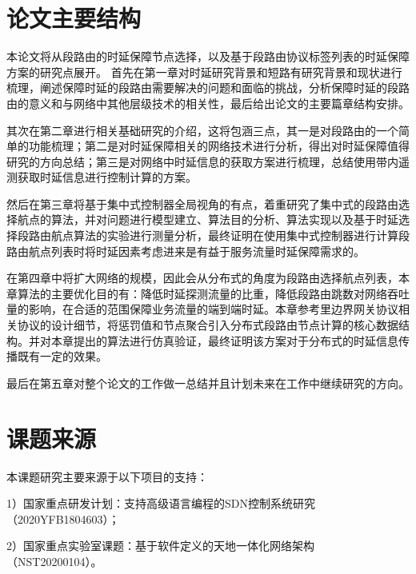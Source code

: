 \section{论文主要结构}

本论文将从段路由的时延保障节点选择，以及基于段路由协议标签列表的时延保障方案的研究点展开。
首先在第一章对时延研究背景和短路有研究背景和现状进行梳理，阐述保障时延的段路由需要解决的问题和面临的挑战，分析保障时延的段路由的意义和与网络中其他层级技术的相关性，最后给出论文的主要篇章结构安排。

其次在第二章进行相关基础研究的介绍，这将包涵三点，其一是对段路由的一个简单的功能梳理；第二是对时延保障相关的网络技术进行分析，得出对时延保障值得研究的方向总结；第三是对网络中时延信息的获取方案进行梳理，总结使用带内遥测获取时延信息进行控制计算的方案。

然后在第三章将基于集中式控制器全局视角的有点，着重研究了集中式的段路由选择航点的算法，并对问题进行模型建立、算法目的分析、算法实现以及基于时延选择段路由航点算法的实验进行测量分析，最终证明在使用集中式控制器进行计算段路由航点列表时将时延因素考虑进来是有益于服务流量时延保障需求的。

在第四章中将扩大网络的规模，因此会从分布式的角度为段路由选择航点列表，本章算法的主要优化目的有：降低时延探测流量的比重，降低段路由跳数对网络吞吐量的影响，在合适的范围保障业务流量的端到端时延。本章参考里边界网关协议相关协议的设计细节，将惩罚值和节点聚合引入分布式段路由节点计算的核心数据结构。并对本章提出的算法进行仿真验证，最终证明该方案对于分布式的时延信息传播既有一定的效果。

最后在第五章对整个论文的工作做一总结并且计划未来在工作中继续研究的方向。

\section{课题来源}
本课题研究主要来源于以下项目的支持：

1）国家重点研发计划：支持高级语言编程的SDN控制系统研究（2020YFB1804603）；

2）国家重点实验室课题：基于软件定义的天地一体化网络架构（NST20200104）。

\ifx\usechapbib\empty
\nocite{BSTcontrol}
\setcounter{NAT@ctr}{0}


\fi

